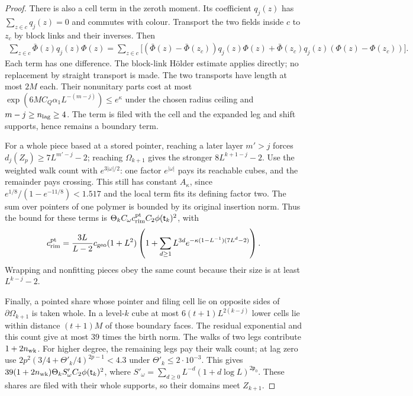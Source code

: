 \documentclass[11pt,letterpaper,reqno]{amsart}
\theoremstyle{definition}
\theoremstyle{remark}
\begin{document}
\begin{proof}
There is also a cell term in the zeroth
moment. Its coefficient $q_j(z)$ has
$\sum_{z\in c}q_j(z)=0$ and commutes with
colour. Transport the two fields inside
$c$ to $z_c$ by block links and their
inverses. Then
\[
\begin{split}
 \sum_{z\in c}\bar\Phi(z)q_j(z)\Phi(z)
 =\sum_{z\in c}\big[
  (\bar\Phi(z)-\bar\Phi(z_c))q_j(z)\Phi(z)
 +\bar\Phi(z_c)q_j(z)(\Phi(z)-\Phi(z_c))\big].
\end{split}
\]
Each term has one difference. The block-link
H\"older estimate applies directly; no
replacement by straight transport is made.
The two transports have length at most
$2M$ each. Their nonunitary parts cost
at most $\exp(6MC_Q\alpha_1L^{-(m-j)})
\le e^\kappa$ under the chosen radius
ceiling and $m-j\ge n_{\rm lag}\ge4$.
The term is filed with the cell and the
expanded leg and shift supports, hence
remains a boundary term.

For a whole piece based at a stored pointer,
reaching a later layer $m'>j$ forces
$d_j(Z_p)\ge7L^{m'-j}-2$; reaching
$\Omega_{k+1}$ gives the stronger
$8L^{k+1-j}-2$. Use the weighted walk
count with $e^{3|\omega|/2}$: one factor
$e^{|\omega|}$ pays its reachable cubes,
and the remainder pays crossing. This
still has constant $A_\kappa$, since
$e^{1/8}/(1-e^{-11/8})<1.517$ and the
local term fits its defining factor two.
The sum over pointers of one polymer
is bounded by its original insertion norm.
Thus the bound for these terms is
$\Theta_k C_\omega c_{\rm rim}^{\rm pt}
C_2\phi(\mathsf t_k)^2$, with
\[
 c_{\rm rim}^{\rm pt}=
 \frac{3L}{L-2}c_{\rm geo}(1+L^2)
 \left(1+\sum_{d\ge1}L^{3d}
                 e^{-\kappa(1-L^{-1})(7L^d-2)}\right).
\]
Wrapping and nonfitting pieces obey the same
count because their size is at least
$L^{k-j}-2$.

Finally, a pointed share whose pointer and
filing cell lie on opposite sides of
$\partial\Omega_{k+1}$ is taken whole.
In a level-$k$ cube at most
$6(t+1)L^{2(k-j)}$ lower cells lie within
distance $(t+1)M$ of those boundary faces.
The residual exponential and this count
give at most $39$ times the birth norm.
The walks of two legs contribute
$1+2n_{\rm wk}$. For higher degree, the
remaining legs pay their walk count;
at lag zero use
$2p^2(3/4+\Theta'_k/4)^{2p-1}<4.3$
under $\Theta'_k\le2\cdot10^{-3}$.
This gives
$39(1+2n_{\rm wk})\Theta_k S'_\omega
C_2\phi(\mathsf t_k)^2$, where
$S'_\omega=\sum_{d\ge0}L^{-d}(1+d\log L)^{2\mathfrak p_0}$.
These shares are filed with their whole supports,
so their domains meet $Z_{k+1}$.


\end{proof}
\end{document}
